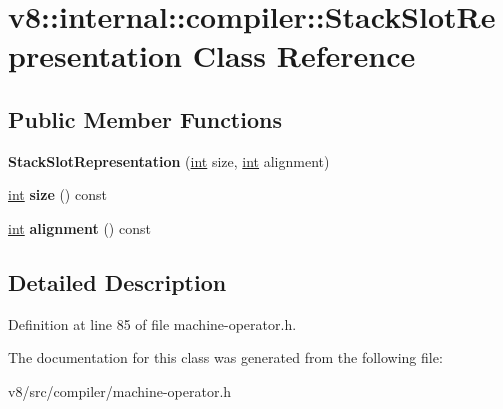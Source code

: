\hypertarget{classv8_1_1internal_1_1compiler_1_1StackSlotRepresentation}{}\section{v8\+:\+:internal\+:\+:compiler\+:\+:Stack\+Slot\+Representation Class Reference}
\label{classv8_1_1internal_1_1compiler_1_1StackSlotRepresentation}
\subsection*{Public Member Functions}
\begin{DoxyCompactItemize}
\item 
\mbox{\label{classv8_1_1internal_1_1compiler_1_1StackSlotRepresentation_a6e4bf9b242c10e84f1bb1cb82f4f5161}} 
{\bfseries Stack\+Slot\+Representation} (\mbox{\hyperlink{classint}{int}} size, \mbox{\hyperlink{classint}{int}} alignment)
\item 
\mbox{\label{classv8_1_1internal_1_1compiler_1_1StackSlotRepresentation_a57f149ec79cd11762a17874514cc5947}} 
\mbox{\hyperlink{classint}{int}} {\bfseries size} () const
\item 
\mbox{\label{classv8_1_1internal_1_1compiler_1_1StackSlotRepresentation_a59d988971e8af98feda037b0dafda8df}} 
\mbox{\hyperlink{classint}{int}} {\bfseries alignment} () const
\end{DoxyCompactItemize}


\subsection{Detailed Description}


Definition at line 85 of file machine-\/operator.\+h.



The documentation for this class was generated from the following file\+:\begin{DoxyCompactItemize}
\item 
v8/src/compiler/machine-\/operator.\+h\end{DoxyCompactItemize}
